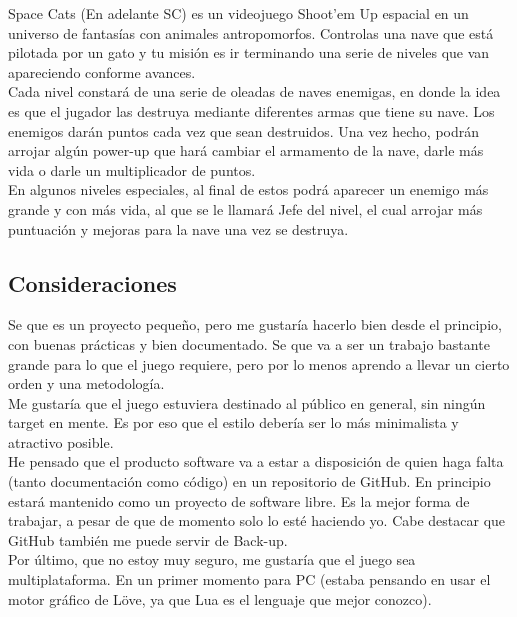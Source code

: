 \documentclass[12pt, spanish, a4paper]{article}
\begin{document}
	Space Cats (En adelante SC) es un videojuego Shoot'em Up espacial en un universo de fantasías con animales antropomorfos. Controlas una nave que está pilotada por un gato y tu misión es ir terminando una serie de niveles que van apareciendo conforme avances. \\
	
	Cada nivel constará de una serie de oleadas de naves enemigas, en donde la idea es que el jugador las destruya mediante diferentes armas que tiene su nave. Los enemigos darán puntos cada vez que sean destruidos. Una vez hecho, podrán arrojar algún power-up que hará cambiar el armamento de la nave, darle más vida o darle un multiplicador de puntos. \\
	
	En algunos niveles especiales, al final de estos podrá aparecer un enemigo más grande y con más vida, al que se le llamará Jefe del nivel, el cual arrojar más puntuación y mejoras para la nave una vez se destruya.
	
	\subsection{Consideraciones}
	
	Se que es un proyecto pequeño, pero me gustaría hacerlo bien desde el principio, con buenas prácticas y bien documentado. Se que va a ser un trabajo bastante grande para lo que el juego requiere, pero por lo menos aprendo a llevar un cierto orden y una metodología. \\
	
	Me gustaría que el juego estuviera destinado al público en general, sin ningún target en mente. Es por eso que el estilo debería ser lo más minimalista y atractivo posible. \\
	
	He pensado que el producto software va a estar a disposición de quien haga falta (tanto documentación como código) en un repositorio de GitHub. En principio estará mantenido como un proyecto de software libre. Es la mejor forma de trabajar, a pesar de que de momento solo lo esté haciendo yo. Cabe destacar que GitHub también me puede servir de Back-up. \\
	
	Por último, que no estoy muy seguro, me gustaría que el juego sea multiplataforma. En un primer momento para PC (estaba pensando en usar el motor gráfico de Löve, ya que Lua es el lenguaje que mejor conozco).
	
	\newpage
	
\end{document}
